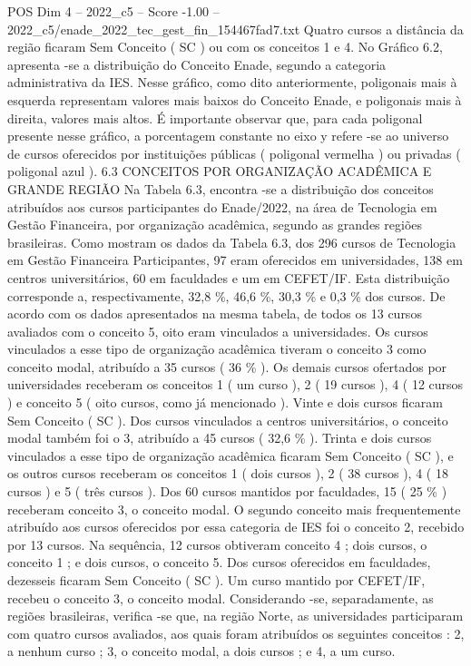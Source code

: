 \begin{textsample}{POS Dim 4 – 2022\_c5 – Score -1.00 – 2022\_c5/enade\_2022\_tec\_gest\_fin\_154467fad7.txt}
Quatro cursos a distância da região ficaram Sem Conceito ( SC ) ou com os conceitos 1 e 4.
No Gráfico 6.2, apresenta -se a distribuição do Conceito Enade, segundo a categoria administrativa da IES.
Nesse gráfico, como dito anteriormente, poligonais mais à esquerda representam valores mais baixos do Conceito Enade, e poligonais mais à direita, valores mais altos.
É importante observar que, para cada poligonal presente nesse gráfico, a porcentagem constante no eixo y refere -se ao universo de cursos oferecidos por instituições públicas ( poligonal vermelha ) ou privadas ( poligonal azul ). 6.3 CONCEITOS POR ORGANIZAÇÃO ACADÊMICA E GRANDE REGIÃO Na Tabela 6.3, encontra -se a distribuição dos conceitos atribuídos aos cursos participantes do Enade/2022, na área de Tecnologia em Gestão Financeira, por organização acadêmica, segundo as grandes regiões brasileiras.
Como mostram os dados da Tabela 6.3, dos 296 cursos de Tecnologia em Gestão Financeira Participantes, 97 eram oferecidos em universidades, 138 em centros universitários, 60 em faculdades e um em CEFET/IF.
Esta distribuição corresponde a, respectivamente, 32,8 \%, 46,6 \%, 30,3 \% e 0,3 \% dos cursos.
De acordo com os dados apresentados na mesma tabela, de todos os 13 cursos avaliados com o conceito 5, oito eram vinculados a universidades.
Os cursos vinculados a esse tipo de organização acadêmica tiveram o conceito 3 como conceito modal, atribuído a 35 cursos ( 36 \% ).
Os demais cursos ofertados por universidades receberam os conceitos 1 ( um curso ), 2 ( 19 cursos ), 4 ( 12 cursos ) e conceito 5 ( oito cursos, como já mencionado ).
Vinte e dois cursos ficaram Sem Conceito ( SC ).
Dos cursos vinculados a centros universitários, o conceito modal também foi o 3, atribuído a 45 cursos ( 32,6 \% ).
Trinta e dois cursos vinculados a esse tipo de organização acadêmica ficaram Sem Conceito ( SC ), e os outros cursos receberam os conceitos 1 ( dois cursos ), 2 ( 38 cursos ), 4 ( 18 cursos ) e 5 ( três cursos ).
Dos 60 cursos mantidos por faculdades, 15 ( 25 \% ) receberam conceito 3, o conceito modal.
O segundo conceito mais frequentemente atribuído aos cursos oferecidos por essa categoria de IES foi o conceito 2, recebido por 13 cursos.
Na sequência, 12 cursos obtiveram conceito 4 ; dois cursos, o conceito 1 ; e dois cursos, o conceito 5.
Dos cursos oferecidos em faculdades, dezesseis ficaram Sem Conceito ( SC ).
Um curso mantido por CEFET/IF, recebeu o conceito 3, o conceito modal.
Considerando -se, separadamente, as regiões brasileiras, verifica -se que, na região Norte, as universidades participaram com quatro cursos avaliados, aos quais foram atribuídos os seguintes conceitos : 2, a nenhum curso ; 3, o conceito modal, a dois cursos ; e 4, a um curso.

\end{textsample}
